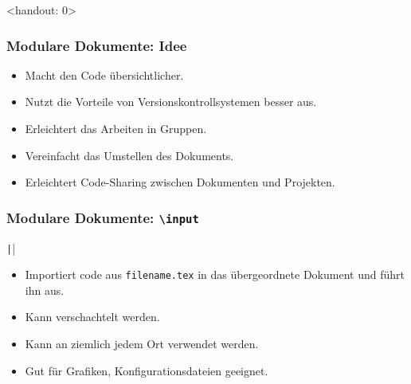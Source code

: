 \documentclass{beamer}                %
\newcommand*\code[1]{\texttt{#1}}
\begin{document}
\begin{frame}<handout: 0> %
    \frametitle{Modulare Dokumente: Idee}


    \begin{itemize}
        \item Macht den Code \"ubersichtlicher.
        \item Nutzt die Vorteile von Versionskontrollsystemen besser aus.
        \item Erleichtert das Arbeiten in Gruppen.
        \item Vereinfacht das Umstellen des Dokuments.
        \item Erleichtert Code-Sharing zwischen Dokumenten und Projekten.
    \end{itemize}

\end{frame}
\begin{frame}[fragile] %
    \frametitle{Modulare Dokumente: \code{\textbackslash input}}
    \begin{center}
        \texttt||
    \end{center}

    \begin{itemize}
        \item
            Importiert code aus \code{filename.tex} in das \"ubergeordnete
            Dokument und f\"uhrt ihn aus.
        \item
            Kann verschachtelt werden.
        \item
            Kann an ziemlich jedem Ort verwendet werden.
        \item
            Gut f\"ur Grafiken, Konfigurationsdateien geeignet.
    \end{itemize}
\end{frame}
\end{document}
